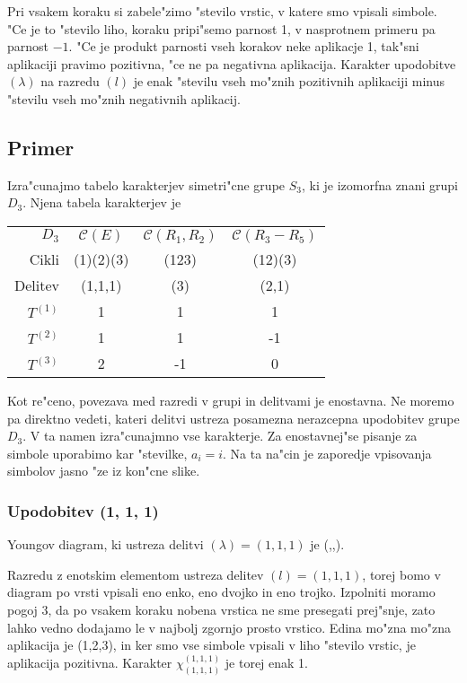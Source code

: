 \documentclass[a4paper,10pt]{article}
\begin{document}
Pri vsakem koraku si zabele"zimo "stevilo vrstic, v katere smo vpisali simbole. "Ce je to "stevilo liho, koraku pripi"semo parnost 1, v nasprotnem primeru pa parnost $-1$. "Ce je produkt parnosti vseh korakov neke aplikacje 1, tak"sni aplikaciji pravimo pozitivna, "ce ne pa negativna aplikacija. Karakter upodobitve $(\lambda)$ na razredu $(l)$ je enak "stevilu vseh mo"znih pozitivnih aplikaciji minus "stevilu vseh mo"znih negativnih aplikacij. 

\subsection{Primer}

Izra"cunajmo tabelo karakterjev simetri"cne grupe $S_3$, ki je izomorfna znani grupi $D_3$. Njena tabela karakterjev je

\begin{table}[h]
 \centering
 \begin{tabular}{|r|c|c|c|}
 \hline
  $D_3$ & $\mathcal{C}(E)$ & $\mathcal{C}(R_1, R_2)$ & $\mathcal{C}(R_3 - R_5)$ \\
  Cikli & (1)(2)(3) & (123) & (12)(3) \\
  Delitev & (1,1,1) & (3) & (2,1) \\
  \hline
  $T^{(1)}$ & 1 & 1 & 1 \\
  $T^{(2)}$ & 1 & 1 & -1 \\
  $T^{(3)}$ & 2 & -1 & 0 \\
  \hline
 \end{tabular}
\end{table}
 
 Kot re"ceno, povezava med razredi v grupi in delitvami je enostavna. Ne moremo pa direktno vedeti, kateri delitvi ustreza posamezna nerazcepna upodobitev grupe $D_3$. V ta namen izra"cunajmno vse karakterje. Za enostavnej"se pisanje za simbole uporabimo kar "stevilke, $a_i = i$. Na ta na"cin je zaporedje vpisovanja simbolov jasno "ze iz kon"cne slike. 
 
 \subsubsection{Upodobitev (1, 1, 1)}
 
 Youngov diagram, ki ustreza delitvi $(\lambda) = (1,1,1)$ je \young(\quad,\quad,\quad). 
 
 Razredu z enotskim elementom ustreza delitev $(l) = (1,1,1)$, torej bomo v diagram po vrsti vpisali eno enko, eno dvojko in eno trojko. Izpolniti moramo pogoj 3, da po vsakem koraku nobena vrstica ne sme presegati prej"snje, zato lahko vedno dodajamo le v najbolj zgornjo prosto vrstico. Edina mo"zna mo"zna aplikacija je \young(1,2,3), in ker smo vse simbole vpisali v liho "stevilo vrstic, je aplikacija pozitivna. Karakter $\chi^{(1,1,1)}_{(1,1,1)}$ je torej enak 1. 
 
\end{document}
